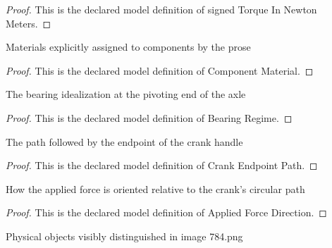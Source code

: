 \begin{proof}
  This is the declared model definition of signed Torque In Newton Meters.
\end{proof}
\begin{definition}
  \label{def:physics:phyx-mini-0784:phyxminiproblems-problemphyxmini0784-componentmaterial}
  Materials explicitly assigned to components by the prose
\end{definition}
\begin{proof}
  This is the declared model definition of Component Material.
\end{proof}
\begin{definition}
  \label{def:physics:phyx-mini-0784:phyxminiproblems-problemphyxmini0784-bearingregime}
  The bearing idealization at the pivoting end of the axle
\end{definition}
\begin{proof}
  This is the declared model definition of Bearing Regime.
\end{proof}
\begin{definition}
  \label{def:physics:phyx-mini-0784:phyxminiproblems-problemphyxmini0784-crankendpointpath}
  The path followed by the endpoint of the crank handle
\end{definition}
\begin{proof}
  This is the declared model definition of Crank Endpoint Path.
\end{proof}
\begin{definition}
  \label{def:physics:phyx-mini-0784:phyxminiproblems-problemphyxmini0784-appliedforcedirection}
  How the applied force is oriented relative to the crank's circular path
\end{definition}
\begin{proof}
  This is the declared model definition of Applied Force Direction.
\end{proof}
\begin{definition}
  \label{def:physics:phyx-mini-0784:phyxminiproblems-problemphyxmini0784-figureobject}
  Physical objects visibly distinguished in image 784.png
\end{definition}
